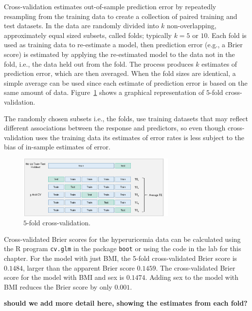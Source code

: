 Cross-validation estimates out-of-sample prediction error by repeatedly resampling from the training data to create a collection of paired training and test datasets. In  the data are randomly divided into $k$ non-overlapping, approximately equal sized subsets, called folds; typically $k = 5 \text{ or } 10$. Each fold is used as training data to re-estimate a model, then prediction error (e.g., a Brier score) is estimated by applying the re-estimated model to the data not in the fold, i.e., the data held out from the fold.  The process produces $k$ estimates of prediction error, which are then averaged. When the fold sizes are identical, a simple average can be used since each estimate of prediction error is based on the same amount of data. Figure~\ref{figure:crossValidation} shows a graphical representation of $5$-fold cross-validation.

The randomly chosen subsets i.e., the folds, use training datasets that may reflect different associations between the response and predictors, so even though cross-validation uses the training data its estimates of error rates is less subject to the bias of in-sample estimates of error.

\begin{figure}[h!]
  \centering
  \includegraphics[width=0.70\textwidth]
  {ch_logistic_regression_oi_biostat/figures/crossValidation/crossValidation.png}
    \caption{$5$-fold cross-validation.}
    \label{figure:crossValidation}
\end{figure}

Cross-validated Brier scores for the hyperuricemia data can be calculated using the \textsf{R} program \texttt{cv.glm} in the package \texttt{boot} or using the code in the lab for this chapter. For the model with just BMI, the 5-fold cross-validated Brier score is $0.1484$, larger than the apparent Brier score $0.1459$.  The cross-validated Brier score for the model with BMI and sex is $0.1474$.  Adding sex to the model with BMI reduces the Brier score by only $0.001$.  

\textbf{should we add more detail here,  showing the estimates from each fold?}

